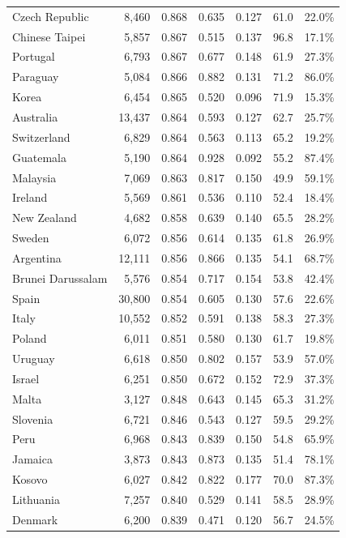 \begin{table}[!t]
\begin{tabular}{@{}lrrrrrr@{}}
Czech Republic & 8,460 & 0.868 & 0.635 & 0.127 & 61.0 & 22.0\% \\
Chinese Taipei & 5,857 & 0.867 & 0.515 & 0.137 & 96.8 & 17.1\% \\
Portugal & 6,793 & 0.867 & 0.677 & 0.148 & 61.9 & 27.3\% \\
Paraguay & 5,084 & 0.866 & 0.882 & 0.131 & 71.2 & 86.0\% \\
Korea & 6,454 & 0.865 & 0.520 & 0.096 & 71.9 & 15.3\% \\
Australia & 13,437 & 0.864 & 0.593 & 0.127 & 62.7 & 25.7\% \\
Switzerland & 6,829 & 0.864 & 0.563 & 0.113 & 65.2 & 19.2\% \\
Guatemala & 5,190 & 0.864 & 0.928 & 0.092 & 55.2 & 87.4\% \\
Malaysia & 7,069 & 0.863 & 0.817 & 0.150 & 49.9 & 59.1\% \\
Ireland & 5,569 & 0.861 & 0.536 & 0.110 & 52.4 & 18.4\% \\
New Zealand & 4,682 & 0.858 & 0.639 & 0.140 & 65.5 & 28.2\% \\
Sweden & 6,072 & 0.856 & 0.614 & 0.135 & 61.8 & 26.9\% \\
Argentina & 12,111 & 0.856 & 0.866 & 0.135 & 54.1 & 68.7\% \\
Brunei Darussalam & 5,576 & 0.854 & 0.717 & 0.154 & 53.8 & 42.4\% \\
Spain & 30,800 & 0.854 & 0.605 & 0.130 & 57.6 & 22.6\% \\
Italy & 10,552 & 0.852 & 0.591 & 0.138 & 58.3 & 27.3\% \\
Poland & 6,011 & 0.851 & 0.580 & 0.130 & 61.7 & 19.8\% \\
Uruguay & 6,618 & 0.850 & 0.802 & 0.157 & 53.9 & 57.0\% \\
Israel & 6,251 & 0.850 & 0.672 & 0.152 & 72.9 & 37.3\% \\
Malta & 3,127 & 0.848 & 0.643 & 0.145 & 65.3 & 31.2\% \\
Slovenia & 6,721 & 0.846 & 0.543 & 0.127 & 59.5 & 29.2\% \\
Peru & 6,968 & 0.843 & 0.839 & 0.150 & 54.8 & 65.9\% \\
Jamaica & 3,873 & 0.843 & 0.873 & 0.135 & 51.4 & 78.1\% \\
Kosovo & 6,027 & 0.842 & 0.822 & 0.177 & 70.0 & 87.3\% \\
Lithuania & 7,257 & 0.840 & 0.529 & 0.141 & 58.5 & 28.9\% \\
Denmark & 6,200 & 0.839 & 0.471 & 0.120 & 56.7 & 24.5\% \\

\end{tabular}
\end{table}
